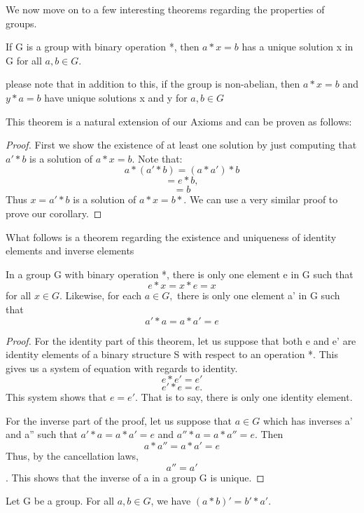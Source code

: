 We now move on to a few interesting theorems regarding the properties of groups.

\begin{theorem}
If G is a group with binary operation *, then $a*x = b$ has a unique solution x in G for all $a,b \in G.$ 
\end{theorem}

\begin{corollary}
please note that in addition to this, if the group is non-abelian, then $a*x =b$ and $y*a=b$ have unique solutions x and y for $a,b \in G$
\end{corollary}

This theorem is a natural extension of our Axioms and can be proven as follows:

\begin{proof}
First we show the existence of at least one solution by just computing that $a'*b$ is a solution of $a*x=b.$ Note that: $$a*(a'*b) = (a*a')*b$$ $$ = e*b,$$ $$=b$$ \newline
Thus $x = a'*b$ is a solution of $a*x=b*.$ We can use a very similar proof to prove our corollary.
\end{proof}

What follows is a theorem regarding the existence and uniqueness of identity elements and inverse elements

\begin{theorem}
In a group G with binary operation *, there is only one element e in G such that $$e*x = x*e = x$$ for all $x \in G.$ Likewise, for each $a \in G,$ there is only one element a' in G such that $$a' * a = a*a' = e$$
\end{theorem}

\begin{proof}
For the identity part of this theorem, let us suppose that both e and e' are identity elements of a binary structure S with respect to an operation *. This gives us a system of equation with regards to identity. $$e*e'=e'$$ $$e'*e=e.$$ This system shows that $e=e'.$ That is to say, there is only one identity element.\newline

For the inverse part of the proof, let us suppose that $a \in G$ which has inverses a' and a'' such that $a'*a= a*a'=e$ and $a''*a=a*a''=e.$ Then $$a*a''=a*a'=e$$ Thus, by the cancellation laws, $$a''=a'$$. This shows that the inverse of a in a group G is unique.
\end{proof}

\begin{corollary}
Let G be a group. For all $a,b \in G$, we have $(a*b)' = b' * a'.$
\end{corollary}

